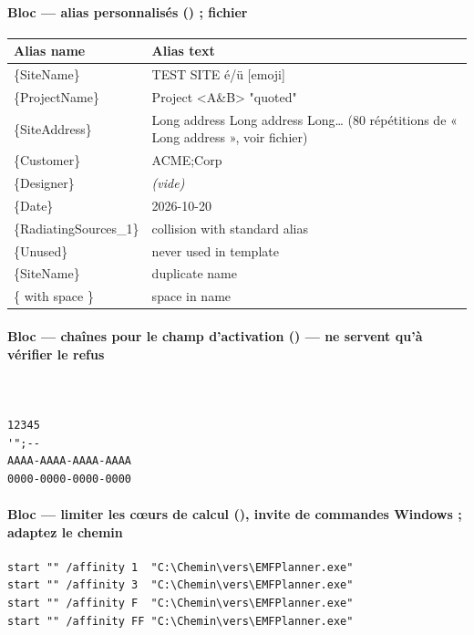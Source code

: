 \paragraph*{Bloc  --- alias personnalisés () ; fichier }
\begin{center}\scriptsize\renewcommand{\arraystretch}{1.1}\begin{tabular}{@{}lp{11.3cm}@{}}\toprule \textbf{Alias name} & \textbf{Alias text}\\\midrule
\{SiteName\} & TEST SITE é/ü [emoji]\\
\{ProjectName\} & Project <A\&B> "quoted"\\
\{SiteAddress\} & Long address Long address Long\ldots{} (80 répétitions de « Long address », voir fichier)\\
\{Customer\} & ACME;Corp\\
\{Designer\} & \emph{(vide)}\\
\{Date\} & 2026-10-20\\
\{RadiatingSources\_1\} & collision with standard alias\\
\{Unused\} & never used in template\\
\{SiteName\} & duplicate name\\
\{ with space \} & space in name\\
\bottomrule\end{tabular}\end{center}
\paragraph*{Bloc  --- chaînes pour le champ d'activation () --- ne servent qu'à vérifier le refus}\vspace{-2pt}
\begin{Verbatim}[frame=single,framesep=1.5mm,fontsize=\footnotesize,rulecolor=\color{accent}]

     
12345
'";--
AAAA-AAAA-AAAA-AAAA
0000-0000-0000-0000
\end{Verbatim}
\paragraph*{Bloc  --- limiter les c\oe urs de calcul (), invite de commandes Windows ; adaptez le chemin}\vspace{-2pt}
\begin{Verbatim}[frame=single,framesep=1.5mm,fontsize=\footnotesize,rulecolor=\color{accent}]
start "" /affinity 1  "C:\Chemin\vers\EMFPlanner.exe"
start "" /affinity 3  "C:\Chemin\vers\EMFPlanner.exe"
start "" /affinity F  "C:\Chemin\vers\EMFPlanner.exe"
start "" /affinity FF "C:\Chemin\vers\EMFPlanner.exe"
\end{Verbatim}

